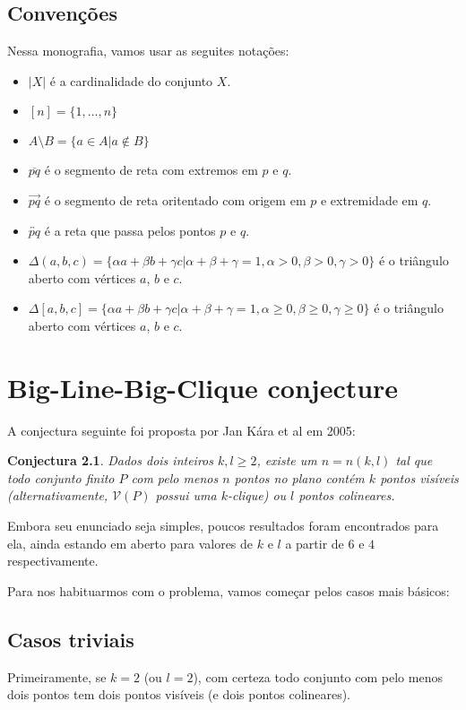 \documentclass[a4paper]{book}
\newtheorem{conjectura}{Conjectura}
\begin{document}
\section{Convenções}
Nessa monografia, vamos usar as seguites notações:
\begin{itemize}
    \item $|X|$ é a cardinalidade do conjunto $X$.
    \item $[n]=\{1,...,n\}$
    \item $A\setminus B = \{a\in A|a\notin B\}$
    \item $\overline{pq}$ é o segmento de reta com extremos em $p$ e $q$.
    \item $\overrightarrow{pq}$ é o segmento de reta oritentado com origem em $p$ e extremidade em $q$.
    \item $\overleftrightarrow{pq}$ é a reta que passa pelos pontos $p$ e $q$.
    \item $\Delta(a,b,c)=\{\alpha a+\beta b+\gamma c|\alpha+\beta+\gamma=1, \alpha>0, \beta>0, \gamma>0\}$ é o triângulo aberto com vértices $a$, $b$ e $c$.
    \item $\Delta[a,b,c]=\{\alpha a+\beta b+\gamma c|\alpha+\beta+\gamma=1, \alpha\geq0, \beta\geq0, \gamma\geq0\}$ é o triângulo aberto com vértices $a$, $b$ e $c$.
\end{itemize}

\chapter{Big-Line-Big-Clique conjecture}
A conjectura seguinte foi proposta por Jan Kára et al em 2005\cite{visibilitygraph}:
\begin{conjectura}\label{conj1}
    Dados dois inteiros $k,l\geq2$, existe um $n=n(k,l)$ tal que todo conjunto finito $P$ com pelo menos $n$ pontos no plano contém $k$ pontos visíveis (alternativamente, $\mathcal V(P)$ possui uma $k$-clique) ou $l$ pontos colineares.
\end{conjectura}
Embora seu enunciado seja simples, poucos resultados foram encontrados para ela, ainda estando em aberto para valores de $k$ e $l$ a partir de $6$ e $4$ respectivamente.

Para nos habituarmos com o problema, vamos começar pelos casos mais básicos:

\section{Casos triviais}
Primeiramente, se $k=2$ (ou $l=2$), com certeza todo conjunto com pelo menos dois pontos tem dois pontos visíveis (e dois pontos colineares).
\end{document}
